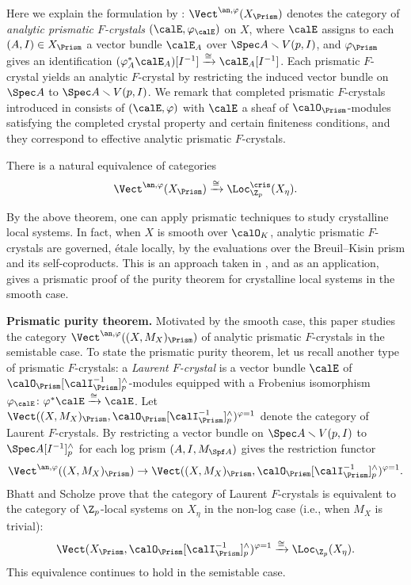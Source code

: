 Here we explain the formulation by \cite{GuoReinecke-Ccris}:
$\Vect^{\an,\varphi}(X_\Prism)$ denotes the category of \emph{analytic prismatic $F$-crystals} $(\calE,\varphi_\calE)$ on $X$, where $\calE$ assigns to each $(A,I)\in X_\Prism$ a vector bundle $\calE_A$ over $\Spec A \smallsetminus V(p,I)$, and $\varphi_\Prism$ gives an identification $(\varphi_A^\ast\calE_A)[I^{-1}]\xrightarrow{\cong}\calE_A[I^{-1}]$. 
Each prismatic $F$-crystal yields an analytic $F$-crystal by restricting the induced vector bundle on $\Spec A$ to $\Spec A \smallsetminus V(p,I)$. We remark that completed prismatic $F$-crystals introduced in \cite{du-liu-moon-shimizu-completed-prismatic-F-crystal-loc-system} consists of $(\calE,\varphi)$ with $\calE$ a sheaf of $\calO_\Prism$-modules satisfying the completed crystal property and certain finiteness conditions, and they correspond to effective analytic prismatic $F$-crystals. 

\begin{thm} 
There is a natural equivalence of categories 
\[
\Vect^{\an,\varphi}(X_\Prism)\xrightarrow{\cong}
\Loc_{\Z_p}^\cris(X_\eta).
\]
\end{thm}

By the above theorem, one can apply prismatic techniques to study crystalline local systems.
In fact, when $X$ is smooth over $\calO_K$, analytic prismatic $F$-crystals are governed, \'etale locally, by the evaluations over the Breuil--Kisin prism and its self-coproducts. This is an approach taken in \cite{du-liu-moon-shimizu-completed-prismatic-F-crystal-loc-system}, and as an application, \cite{moon-purity} gives a prismatic proof of the purity theorem for crystalline local systems in the smooth case.

\medskip \noindent
\textbf{Prismatic purity theorem.}
Motivated by the smooth case, this paper studies the category $\Vect^{\an,\varphi}((X,M_X)_\Prism)$ of analytic prismatic $F$-crystals in the semistable case. To state the prismatic purity theorem, let us recall another type of prismatic $F$-crystals:
a \emph{Laurent $F$-crystal} is a vector bundle $\calE$ of $\calO_\Prism[\calI_\Prism^{-1}]^\wedge_p$-modules equipped with a Frobenius isomorphism $\varphi_\calE\colon \varphi^\ast\calE\xrightarrow{\cong}\calE$. 
Let $\Vect((X,M_X)_\Prism,\calO_\Prism[\calI_\Prism^{-1}]^\wedge_p)^{\varphi=1}$ denote the category of Laurent $F$-crystals. By restricting a vector bundle on $\Spec A\smallsetminus V(p,I)$ to $\Spec A[I^{-1}]^\wedge_p$ for each log prism $(A,I,M_{\Spf A})$ gives the restriction functor
\[
\Vect^{\an,\varphi}((X,M_X)_\Prism)\rightarrow \Vect((X,M_X)_\Prism,\calO_\Prism[\calI_\Prism^{-1}]^\wedge_p)^{\varphi=1}.
\]
Bhatt and Scholze prove that the category of Laurent $F$-crystals is equivalent to the category of $\Z_p$-local systems on $X_\eta$ \cite[Cor.~3.8]{bhatt-scholze-prismaticFcrystal} in the non-log case (i.e., when $M_X$ is trivial): 
\[
\Vect(X_\Prism,\calO_\Prism[\calI_\Prism^{-1}]^\wedge_p)^{\varphi=1}\xrightarrow{\cong} \Loc_{\Z_p}(X_\eta).
\]
This equivalence continues to hold in the semistable case.

